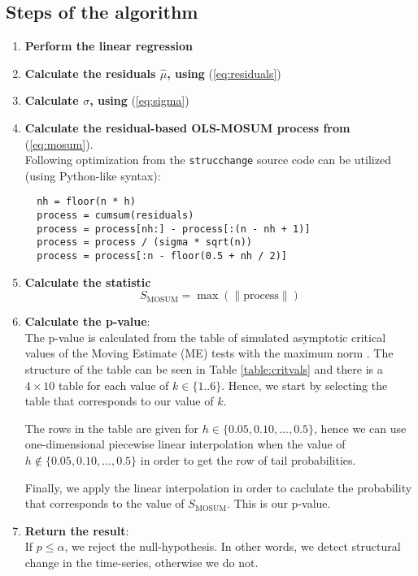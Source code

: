 \documentclass[main.tex]{subfiles}
\begin{document}
\subsection{Steps of the algorithm}
\label{subsec:the_algorithm_steps}
\begin{enumerate}
\item \textbf{Perform the linear regression}
\item \textbf{Calculate the residuals $\hat{\mu}$, using} (\ref{eq:residuals})
\item \textbf{Calculate $\sigma$, using} (\ref{eq:sigma})
\item \textbf{Calculate the residual-based OLS-MOSUM process from}
  (\ref{eq:mosum}). \\
  Following optimization from the \texttt{strucchange} source
  code \cite{strucchange_code} can be utilized (using Python-like syntax):
  \begin{verbatim}
  nh = floor(n * h)
  process = cumsum(residuals)
  process = process[nh:] - process[:(n - nh + 1)]
  process = process / (sigma * sqrt(n))
  process = process[:n - floor(0.5 + nh / 2)]
  \end{verbatim}
\item \textbf{Calculate the statistic}
  \[
  S_{\text{MOSUM}} = \max(\|\text{process}\|)
  \]
\item \textbf{Calculate the p-value}:\\
  The p-value is calculated from the table of
  simulated asymptotic critical values of the Moving Estimate (ME) tests with
  the maximum norm \cite{moving_estimate_test}. The structure of the table can
  be seen in Table \ref{table:critvals} and there is a $4 \times 10$ table for
  each value of $k \in \{1..6\}$. Hence, we start by selecting the table that
  corresponds to our value of $k$.

  The rows in the table are
  given for $h \in \{0.05, 0.10, ..., 0.5\}$, hence we can use one-dimensional
  piecewise linear interpolation when the value of
  $h \notin \{0.05, 0.10, ..., 0.5\}$ in order to get the row of tail
  probabilities.

  Finally, we apply the linear interpolation in order to caclulate the
  probability that corresponds to the value of $S_{\text{MOSUM}}$. This is our p-value.
\item \textbf{Return the result}: \\
  If $p \leq \alpha$, we reject the null-hypothesis. In other words, we detect
  structural change in the time-series, otherwise we do not.
\end{enumerate}
\end{document}
